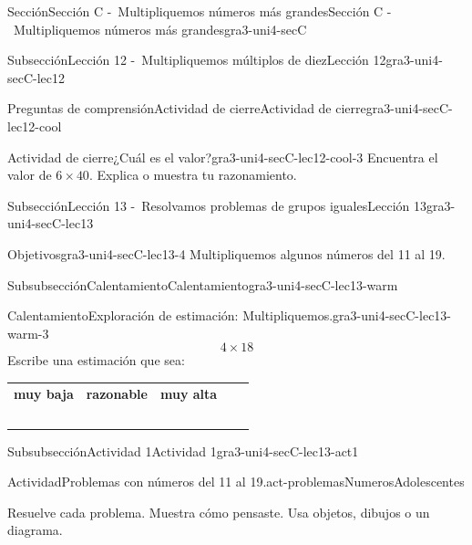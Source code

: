 \documentclass[twoside,10pt,]{article}
\newcommand{\tabularfont}{\relax}
\newcommand{\hrulethin}  {\noalign{\hrule height 0.04em}}
\begin{document}
\begin{sectionptx}{Sección}{Sección C -~Multipliquemos números más grandes}{}{Sección C -~Multipliquemos números más grandes}{}{}{gra3-uni4-secC}
\begin{subsectionptx}{Subsección}{Lección 12 -~Multipliquemos múltiplos de diez}{}{Lección 12}{}{}{gra3-uni4-secC-lec12}
\begin{reading-questions-subsubsection}{Preguntas de comprensión}{Actividad de cierre}{}{Actividad de cierre}{}{}{gra3-uni4-secC-lec12-cool}
\begin{project}{Actividad de cierre}{¿Cuál es el valor?}{gra3-uni4-secC-lec12-cool-3}
Encuentra el valor de \(6\times 40\). Explica o muestra tu razonamiento.%
\end{project}%
\end{reading-questions-subsubsection}
\end{subsectionptx}
%
%
\typeout{************************************************}
\typeout{************************************************}
%
\begin{subsectionptx}{Subsección}{Lección 13 -~Resolvamos problemas de grupos iguales}{}{Lección 13}{}{}{gra3-uni4-secC-lec13}
\begin{objectives}{Objetivos}{gra3-uni4-secC-lec13-4}
Multipliquemos algunos números del 11 al 19.%
\end{objectives}
%
%
\typeout{************************************************}
\typeout{************************************************}
%
\begin{subsubsectionptx}{Subsubsección}{Calentamiento}{}{Calentamiento}{}{}{gra3-uni4-secC-lec13-warm}
\begin{exploration}{Calentamiento}{Exploración de estimación: Multipliquemos.}{gra3-uni4-secC-lec13-warm-3}%
%
\begin{equation*}
4\times 18
\end{equation*}
Escribe una estimación que sea:%
\begin{center}%
{\tabularfont%
\begin{tabular}{lAlAl}
{\bfseries{}muy baja}&{\bfseries{}razonable}&{\bfseries{}muy alta}\tabularnewline\hrulethin
~&~&~
\end{tabular}
}%
\end{center}%
\end{exploration}%
\end{subsubsectionptx}
%
%
\typeout{************************************************}
\typeout{************************************************}
%
\begin{subsubsectionptx}{Subsubsección}{Actividad 1}{}{Actividad 1}{}{}{gra3-uni4-secC-lec13-act1}
\begin{activity}{Actividad}{Problemas con números del 11 al 19.}{act-problemasNumerosAdolescentes}%
\begin{sidebyside}{2}{0.05}{0.05}{0.1}%
\begin{sbspanel}{0.5}%
Resuelve cada problema. Muestra cómo pensaste. Usa objetos, dibujos o un diagrama.%
\end{sbspanel}%

\end{sidebyside}
\end{activity}
\end{subsubsectionptx}
\end{subsectionptx}
\end{sectionptx}
\end{document}
